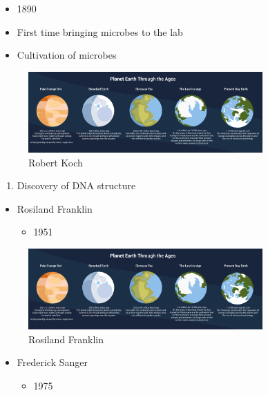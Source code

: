 \documentclass[
]{book}
\providecommand{\tightlist}{%
  \setlength{\itemsep}{0pt}\setlength{\parskip}{0pt}}
\begin{document}
\begin{itemize}
\tightlist
\item
  1890
\item
  First time bringing microbes to the lab
\item
  Cultivation of microbes
\end{itemize}

\begin{figure}
\centering
\includegraphics[width=0.8\textwidth,height=\textheight]{./Figures/Planets.png}
\caption{Robert Koch}
\end{figure}

\begin{enumerate}
\def\labelenumi{\arabic{enumi}.}
\setcounter{enumi}{2}
\tightlist
\item
  Discovery of DNA structure
\end{enumerate}

\begin{itemize}
\tightlist
\item
  Rosiland Franklin

  \begin{itemize}
  \tightlist
  \item
    1951
  \end{itemize}
\end{itemize}

\begin{figure}
\centering
\includegraphics[width=0.8\textwidth,height=\textheight]{./Figures/Planets.png}
\caption{Rosiland Franklin}
\end{figure}

\begin{itemize}
\tightlist
\item
  Frederick Sanger

  \begin{itemize}
  \tightlist
  \item
    1975
  \end{itemize}
\end{itemize}
\end{document}
